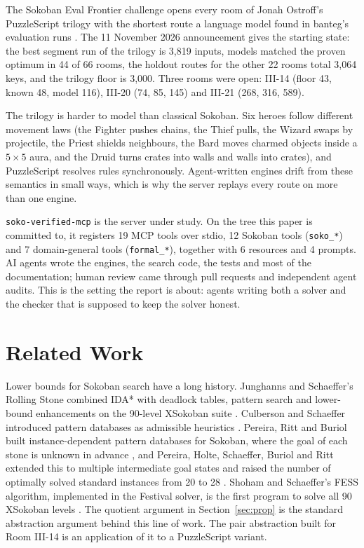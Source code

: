 \documentclass[11pt,a4paper]{article}
\begin{document}
The Sokoban Eval Frontier challenge \cite{banteg2026announce,sokobanteg2026frontier} opens every room of Jonah Ostroff's PuzzleScript trilogy \cite{ostroff2026heroes} with the shortest route a language model found in banteg's evaluation runs \cite{banteg2026sokoban}. The 11 November 2026 announcement \cite{banteg2026announce} gives the starting state: the best segment run of the trilogy is 3,819 inputs, models matched the proven optimum in 44 of 66 rooms, the holdout routes for the other 22 rooms total 3,064 keys, and the trilogy floor is 3,000. Three rooms were open: III-14 (floor 43, known 48, model 116), III-20 (74, 85, 145) and III-21 (268, 316, 589).

The trilogy is harder to model than classical Sokoban. Six heroes follow different movement laws (the Fighter pushes chains, the Thief pulls, the Wizard swaps by projectile, the Priest shields neighbours, the Bard moves charmed objects inside a $5\times 5$ aura, and the Druid turns crates into walls and walls into crates), and PuzzleScript resolves rules synchronously. Agent-written engines drift from these semantics in small ways, which is why the server replays every route on more than one engine.

\texttt{soko-verified-mcp} is the server under study. On the tree this paper is committed to, it registers 19 MCP tools over stdio, 12 Sokoban tools (\texttt{soko\_*}) and 7 domain-general tools (\texttt{formal\_*}), together with 6 resources and 4 prompts. AI agents wrote the engines, the search code, the tests and most of the documentation; human review came through pull requests and independent agent audits. This is the setting the report is about: agents writing both a solver and the checker that is supposed to keep the solver honest.

\section{Related Work}

Lower bounds for Sokoban search have a long history. Junghanns and Schaeffer's Rolling Stone combined IDA* with deadlock tables, pattern search and lower-bound enhancements on the 90-level XSokoban suite \cite{junghanns2001sokoban}. Culberson and Schaeffer introduced pattern databases as admissible heuristics \cite{culberson1998pdb}. Pereira, Ritt and Buriol built instance-dependent pattern databases for Sokoban, where the goal of each stone is unknown in advance \cite{pereira2013instance}, and Pereira, Holte, Schaeffer, Buriol and Ritt extended this to multiple intermediate goal states and raised the number of optimally solved standard instances from 20 to 28 \cite{pereira2016improved}. Shoham and Schaeffer's FESS algorithm, implemented in the Festival solver, is the first program to solve all 90 XSokoban levels \cite{shoham2020fess}. The quotient argument in Section~\ref{sec:prop} is the standard abstraction argument behind this line of work. The pair abstraction built for Room III-14 is an application of it to a PuzzleScript variant.
\end{document}
